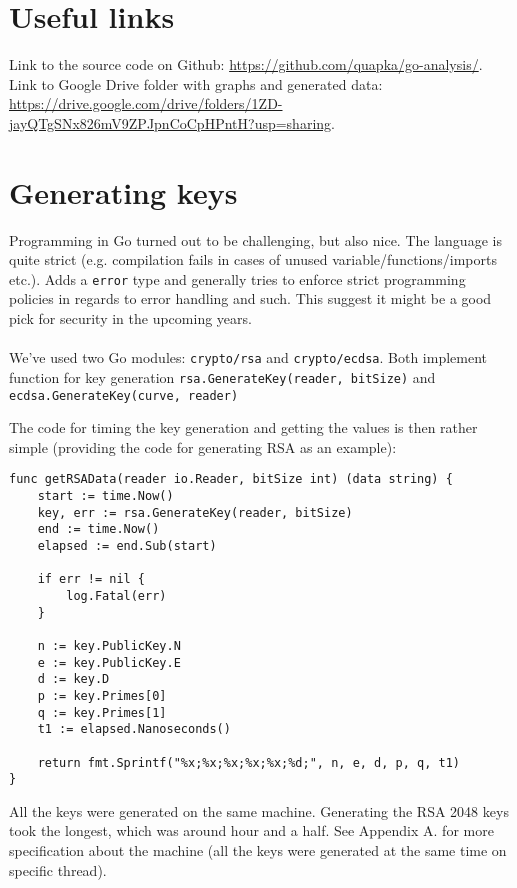 \documentclass[a4paper]{scrartcl}
\begin{document}
\section{Useful links}
Link to the source code on Github: \url{https://github.com/quapka/go-analysis/}.
Link to Google Drive folder with graphs and generated data: \url{https://drive.google.com/drive/folders/1ZD-jayQTgSNx826mV9ZPJpnCoCpHPntH?usp=sharing}.

\section{Generating keys}
Programming in Go turned out to be challenging, but also nice. The language is quite strict (e.g. compilation fails in cases of unused variable/functions/imports etc.). Adds a \verb+error+ type and generally tries to enforce strict programming policies in regards to error handling and such. This suggest it might be a good pick for security in the upcoming years.
\\\\
We've used two Go modules: \verb+crypto/rsa+ and \verb+crypto/ecdsa+. Both implement function for key generation \verb+rsa.GenerateKey(reader, bitSize)+ and\\ \verb+ecdsa.GenerateKey(curve, reader)+

The code for timing the key generation and getting the values is then rather simple (providing the code for generating RSA as an example):
\begin{lstlisting}[caption=Function for generating RSA key values and measurements, captionpos=b]
func getRSAData(reader io.Reader, bitSize int) (data string) {
	start := time.Now()
	key, err := rsa.GenerateKey(reader, bitSize)
	end := time.Now()
	elapsed := end.Sub(start)

	if err != nil {
		log.Fatal(err)
	}

	n := key.PublicKey.N
	e := key.PublicKey.E
	d := key.D
	p := key.Primes[0]
	q := key.Primes[1]
	t1 := elapsed.Nanoseconds()

	return fmt.Sprintf("%x;%x;%x;%x;%x;%d;", n, e, d, p, q, t1)
}
\end{lstlisting}

All the keys were generated on the same machine. Generating the RSA 2048 keys took the longest, which was around hour and a half. See Appendix A. for more specification about the machine (all the keys were generated at the same time on specific thread).
\end{document}

